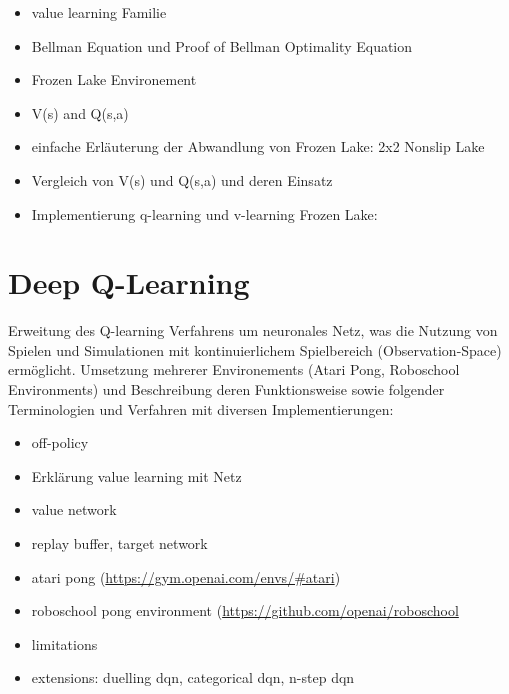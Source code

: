 \documentclass[11pt]{scrartcl}
\begin{document}
\begin{itemize}
\itemsep0pt
\item value learning Familie
\item Bellman Equation und Proof of Bellman Optimality Equation 
\item Frozen Lake Environement
\item V(s) and Q(s,a)
\item einfache Erläuterung der Abwandlung von Frozen Lake: 2x2 Nonslip Lake
\item Vergleich von V(s) und Q(s,a) und deren Einsatz
\item Implementierung q-learning und v-learning Frozen Lake:
\end{itemize}

\section{Deep Q-Learning}
Erweitung des Q-learning Verfahrens um neuronales Netz, was die Nutzung von Spielen und
Simulationen mit kontinuierlichem Spielbereich (Observation-Space) ermöglicht. Umsetzung
mehrerer Environements (Atari Pong, Roboschool Environments) und Beschreibung deren
Funktionsweise sowie folgender Terminologien und Verfahren mit diversen Implementierungen:

\begin{itemize}
\itemsep0pt
\item off-policy
\item Erklärung value learning mit Netz
\item value network
\item replay buffer, target network
\item atari pong (\url{https://gym.openai.com/envs/#atari})
\item roboschool pong environment (\url{https://github.com/openai/roboschool}
\item limitations
\item extensions: duelling dqn, categorical dqn, n-step dqn
\end{itemize}

\end{document}
